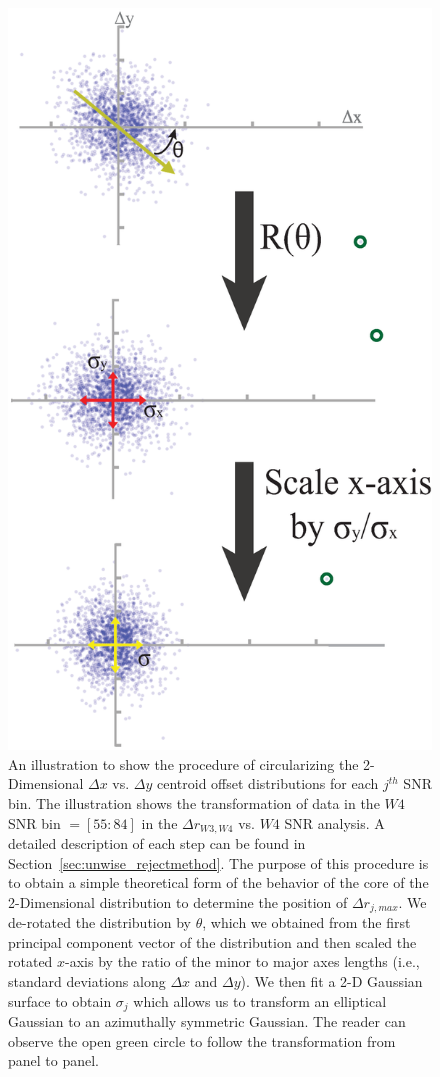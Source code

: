 \begin{figure}
\centering
\includegraphics[scale=0.45]{Ch4/unwise_transform_python} 
\caption{An illustration to show the procedure of circularizing the 2-Dimensional $\Delta x$ vs. $\Delta y$ centroid offset distributions for each $j^{th}$ SNR bin. The illustration shows the transformation of data in the $W4$ SNR bin $= [55:84]$ in the $\Delta r_{W3,W4}$ vs. $W4$ SNR analysis. A detailed description of each step can be found in Section~\ref{sec:unwise_rejectmethod}. The purpose of this procedure is to obtain a simple theoretical form of the behavior of the core of the 2-Dimensional distribution to determine the position of $\Delta r_{j,max}$. We de-rotated the distribution by $\theta$, which we obtained from the first principal component vector of the distribution and then scaled the rotated $x$-axis by the ratio of the minor to major axes lengths (i.e., standard deviations along $\Delta x$ and $\Delta y$). We then fit a 2-D Gaussian surface to obtain $\sigma_j$ which allows us to transform an elliptical Gaussian to an azimuthally symmetric Gaussian. The reader can observe the open green circle to follow the transformation from panel to panel.}
\label{fig:unwise_transform}
\end{figure}


